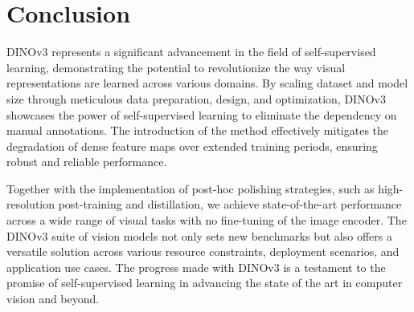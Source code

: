 \section{Conclusion}

DINOv3 represents a significant advancement in the field of self-supervised learning, demonstrating the potential to revolutionize the way visual representations are learned across various domains. 
By scaling dataset and model size through meticulous data preparation, design, and optimization, DINOv3 showcases the power of self-supervised learning to eliminate the dependency on manual annotations. 
The introduction of the \gramname method effectively mitigates the degradation of dense feature maps over extended training periods, ensuring robust and reliable performance.

Together with the implementation of post-hoc polishing strategies, such as high-resolution post-training and distillation, we achieve state-of-the-art performance across a wide range of visual tasks with no fine-tuning of the image encoder. 
The DINOv3 suite of vision models not only sets new benchmarks but also offers a versatile solution across various resource constraints, deployment scenarios, and application use cases.
The progress made with DINOv3 is a testament to the promise of self-supervised learning in advancing the state of the art in computer vision and beyond. 
